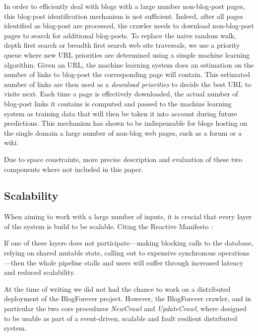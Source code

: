 In order to efficiently deal with blogs with a large number non-blog-post pages, this blog-post identification mechanism is not sufficient. Indeed, after all pages identified as blog-post are processed, the crawler needs to download non-blog-post pages to search for additional blog-posts. To replace the naive random walk, depth first search or breadth first search web site traversals, we use a priority queue where new URL priorities are determined using a simple machine learning algorithm. Given an URL, the machine learning system does an estimation on the number of links to blog-post the corresponding page will contain. This estimated number of links are then used as a \emph{download priorities} to decide the best URL to visite next. Each time a page is effectively downloaded, the actual number of blog-post links it contains is computed and passed to the machine learning system as training data that will then be taken it into account during future predictions. This mechanism has shown to be indispensable for blogs hosting on the single domain a large number of non-blog web pages, such as a forum or a wiki.

Due to space constraints, more precise description and evaluation of these two components where not included in this paper.


\subsection{Scalability}
When aiming to work with a large number of inputs, it is crucial that every layer of the system is build to be scalable. Citing the Reactive Manifesto \cite{thereactivemanifesto2013}:

\begin{quoting}
  If one of these layers does not participate—making blocking calls to the database, relying on shared mutable state, calling out to expensive synchronous operations—then the whole pipeline stalls and users will suffer through increased latency and reduced scalability.
\end{quoting}

At the time of writing we did not had the chance to work on a distributed deployment of the BlogForever project. However, the BlogForever crawler, and in particular the two core procedures \emph{NewCrawl} and \emph{UpdateCrawl}, where designed to be usable as part of a event-driven, scalable and fault resilient distributed system.


